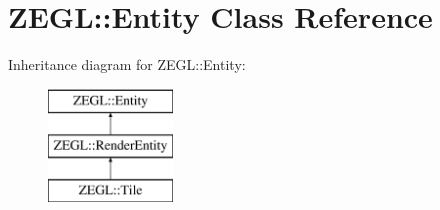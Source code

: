 \hypertarget{class_z_e_g_l_1_1_entity}{}\section{Z\+E\+G\+L\+:\+:Entity Class Reference}
\label{class_z_e_g_l_1_1_entity}
Inheritance diagram for Z\+E\+G\+L\+:\+:Entity\+:\begin{figure}[H]
\begin{center}
\leavevmode
\includegraphics[height=3.000000cm]{class_z_e_g_l_1_1_entity}
\end{center}
\end{figure}
